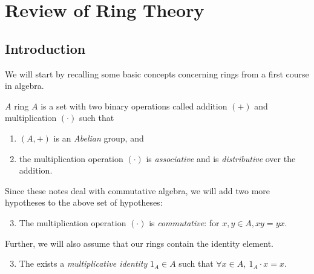 \chapter{Review of Ring Theory}
\section{Introduction}
We will start by recalling some basic concepts concerning rings from a first course in algebra.
\begin{definition}[Ring]\label{def: ring}
    $A$ ring $A$ is a set with two binary operations called addition $(+)$ and multiplication $(\cdot)$ such that
    \begin{enumerate}
    \item $(A,+)$ is an {\it Abelian} group, and

    \item the multiplication operation $(\cdot)$ is {\it associative} and is {\it distributive} over the addition.
    \end{enumerate}
\end{definition}

Since these notes deal with commutative algebra, we will add two more hypotheses to the above set of hypotheses:
\begin{enumerate}
 \setcounter{enumi}{2}
\item The multiplication operation $(\cdot)$ is {\it commutative}: for $x, y \in A, x y = y x$.
\end{enumerate}
Further, we will also assume that our rings contain the identity element.
\begin{enumerate}
 \setcounter{enumi}{2}
\item The exists a {\it multiplicative identity } $1_{A} \in A$ such that $\forall x \in A,\ 1_{A} \cdot x = x$.
\end{enumerate}

